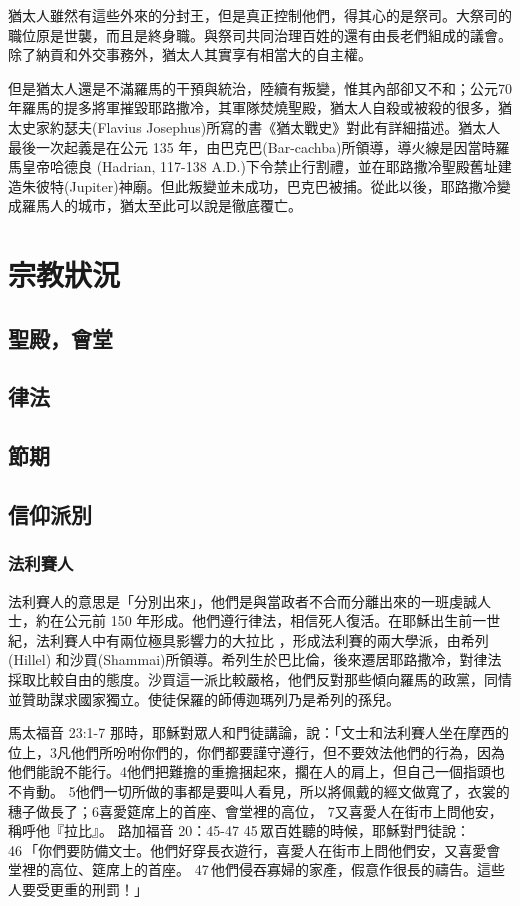 猶太人雖然有這些外來的分封王，但是真正控制他們，得其心的是祭司。大祭司的職位原是世襲，而且是終身職。與祭司共同治理百姓的還有由長老們組成的議會。除了納貢和外交事務外，猶太人其實享有相當大的自主權。

但是猶太人還是不滿羅馬的干預與統治，陸續有叛變，惟其內部卻又不和；公元70 年羅馬的提多將軍摧毀耶路撒冷，其軍隊焚燒聖殿，猶太人自殺或被殺的很多，猶太史家約瑟夫(Flavius Josephus)所寫的書《猶太戰史》對此有詳細描述。猶太人最後一次起義是在公元 135 年，由巴克巴(Bar-cachba)所領導，導火線是因當時羅馬皇帝哈德良 (Hadrian, 117-138 A.D.)下令禁止行割禮，並在耶路撒冷聖殿舊址建造朱彼特(Jupiter)神廟。但此叛變並未成功，巴克巴被捕。從此以後，耶路撒冷變成羅馬人的城市，猶太至此可以說是徹底覆亡。
　　
\section{宗教狀況}
\subsection{聖殿，會堂}

\subsection{律法}
\subsection{節期}
\subsection{信仰派別}
\subsubsection{法利賽人}

法利賽人的意思是「分別出來」，他們是與當政者不合而分離出來的一班虔誠人士，約在公元前 150 年形成。他們遵行律法，相信死人復活。在耶穌出生前一世紀，法利賽人中有兩位極具影響力的大拉比 ，形成法利賽的兩大學派，由希列(Hillel) 和沙買(Shammai)所領導。希列生於巴比倫，後來遷居耶路撒冷，對律法採取比較自由的態度。沙買這一派比較嚴格，他們反對那些傾向羅馬的政黨，同情並贊助謀求國家獨立。使徒保羅的師傅迦瑪列乃是希列的孫兒。

馬太福音 
23:1-7 那時，耶穌對眾人和門徒講論，說：「文士和法利賽人坐在摩西的位上，3凡他們所吩咐你們的，你們都要謹守遵行，但不要效法他們的行為，因為他們能說不能行。4他們把難擔的重擔捆起來，擱在人的肩上，但自己一個指頭也不肯動。 5他們一切所做的事都是要叫人看見，所以將佩戴的經文做寬了，衣裳的穗子做長了；6喜愛筵席上的首座、會堂裡的高位， 7又喜愛人在街市上問他安，稱呼他『拉比』。
路加福音 20：45-47
45 眾百姓聽的時候，耶穌對門徒說： 46 「你們要防備文士。他們好穿長衣遊行，喜愛人在街市上問他們安，又喜愛會堂裡的高位、筵席上的首座。 47 他們侵吞寡婦的家產，假意作很長的禱告。這些人要受更重的刑罰！」

